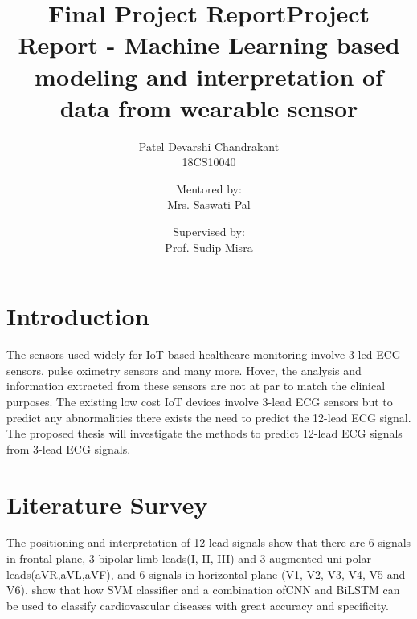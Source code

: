 \documentclass[10pt,a4paper]{article}
\title{Final Project Report}
\begin{document}
\title{\textbf{Project Report - Machine Learning based modeling and interpretation of data from wearable sensor}}
\author{
  Patel Devarshi Chandrakant \\
  18CS10040
  \and
  Mentored by: \\
  Mrs. Saswati Pal
  \and
  Supervised by: \\
  Prof. Sudip Misra
}
\date{}
\maketitle

\makeatletter
\newcommand\thefontsize[1]{{#1 The current font size is: \f@size pt\par}}
\makeatother


\section{Introduction}
\begin{normalsize}
The sensors used widely for IoT-based healthcare monitoring involve 3-led ECG sensors, pulse oximetry sensors and many more. Hover, the analysis and information extracted from these sensors are not at par to match the clinical purposes. The existing low cost IoT devices involve 3-lead ECG sensors but to predict any abnormalities there exists the need to predict the 12-lead ECG signal. The proposed thesis will investigate the methods to predict 12-lead ECG signals from 3-lead ECG signals.  
\end{normalsize} 
\section{Literature Survey}
\begin{normalsize}
The positioning and interpretation of 12-lead signals show that there are 6 signals in frontal plane, 3 bipolar limb leads(I, II, III) and 3 augmented uni-polar leads(aVR,aVL,aVF), and 6 signals in horizontal plane (V1, V2, V3, V4, V5 and  V6). \citep{liang2020dl} show that how SVM classifier and a combination ofCNN and BiLSTM can be used to classify cardiovascular diseases with great accuracy and specificity.  
\end{normalsize}
\end{document}
